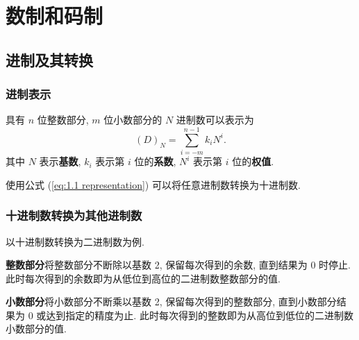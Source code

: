 \section{数制和码制}
\subsection{进制及其转换}
\subsubsection{进制表示}
具有 $n$ 位整数部分, $m$ 位小数部分的 $N$ 进制数可以表示为
\begin{equation} \label{eq:1.1 representation}
    (D)_N=\sum_{i=-m}^{n-1}k_iN^i.
\end{equation}
其中 $N$ 表示\textbf{基数}, $k_i$ 表示第 $i$ 位的\textbf{系数}, $N^i$ 表示第 $i$ 位的\textbf{权值}.

使用公式 (\ref{eq:1.1 representation}) 可以将任意进制数转换为十进制数.

\subsubsection{十进制数转换为其他进制数}
以十进制数转换为二进制数为例.

\textbf{整数部分}\quad 将整数部分不断除以基数 2, 保留每次得到的余数, 直到结果为 0 时停止. 此时每次得到的余数即为从低位到高位的二进制数整数部分的值.

\textbf{小数部分}\quad 将小数部分不断乘以基数 2, 保留每次得到的整数部分, 直到小数部分结果为 0 或达到指定的精度为止. 此时每次得到的整数即为从高位到低位的二进制数小数部分的值.

